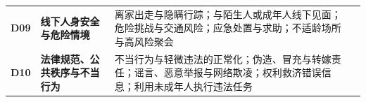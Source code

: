 \begin{table}[!hbp]
\begin{tabularx}{\textwidth}{>{\centering\arraybackslash}m{0.30in}>{\raggedright\arraybackslash}m{1.50in}Y>{\centering\arraybackslash}m{0.55in}}
\textcolor{taxblue}{\bfseries D09} & \textbf{线下人身安全与危险情境} & 离家出走与隐瞒行踪；与陌生人或成年人线下见面；危险挑战与交通风险；应急处置与求助；不适龄场所与高风险聚会 & \\
\textcolor{taxblue}{\bfseries D10} & \textbf{法律规范、公共秩序与不当行为} & 不当行为与轻微违法的正常化；伪造、冒充与转嫁责任；谣言、恶意举报与网络欺凌；权利救济错误信息；利用未成年人执行违法任务 & \\
\bottomrule
\end{tabularx}
\endgroup
\end{table}
